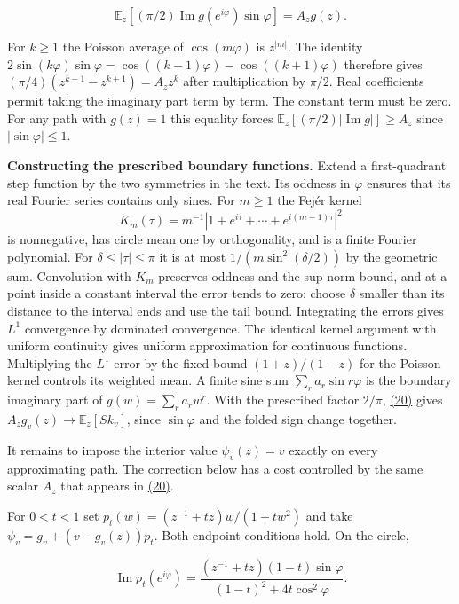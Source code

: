 \documentclass[11pt,a4paper]{article}
\begin{document}
\[
 \mathbb E_z[(\pi/2)\operatorname{Im}g(e^{i\varphi})\sin\varphi]=A_zg(z).
                                                                            \tag{20}\label{eq:20}
\]

For \(k\ge1\) the Poisson average of \(\cos(m\varphi)\) is \(z^{|m|}\). The identity \(2\sin(k\varphi)\sin\varphi=\cos((k-1)\varphi)-\cos((k+1)\varphi)\) therefore gives \((\pi/4)(z^{k-1}-z^{k+1})=A_z z^k\) after multiplication by \(\pi/2\). Real coefficients permit taking the imaginary part term by term. The constant term must be zero. For any path with \(g(z)=1\) this equality forces \(\mathbb E_z[(\pi/2)|\operatorname{Im}g|]\ge A_z\) since \(|\sin\varphi|\le1\).

\textbf{Constructing the prescribed boundary functions.} Extend a first-quadrant step function by the two symmetries in the text. Its oddness in \(\varphi\) ensures that its real Fourier series contains only sines. For \(m\ge1\) the Fejér kernel \[
 K_m(\tau)=m^{-1}|1+e^{i\tau}+\cdots+e^{i(m-1)\tau}|^2
\] is nonnegative, has circle mean one by orthogonality, and is a finite Fourier polynomial. For \(\delta\le|\tau|\le\pi\) it is at most \(1/(m\sin^2(\delta/2))\) by the geometric sum. Convolution with \(K_m\) preserves oddness and the sup norm bound, and at a point inside a constant interval the error tends to zero: choose \(\delta\) smaller than its distance to the interval ends and use the tail bound. Integrating the errors gives \(L^1\) convergence by dominated convergence. The identical kernel argument with uniform continuity gives uniform approximation for continuous functions. Multiplying the \(L^1\) error by the fixed bound \((1+z)/(1-z)\) for the Poisson kernel controls its weighted mean. A finite sine sum \(\sum_r a_r\sin r\varphi\) is the boundary imaginary part of \(g(w)=\sum_r a_rw^r\). With the prescribed factor \(2/\pi\), \hyperref[eq:20]{(20)} gives \(A_z g_v(z)\to\mathbb E_z[Sk_v]\), since \(\sin\varphi\) and the folded sign change together.

It remains to impose the interior value \(\psi_v(z)=v\) exactly on every approximating path. The correction below has a cost controlled by the same scalar \(A_z\) that appears in \hyperref[eq:20]{(20)}.

For \(0<t<1\) set \(p_t(w)=(z^{-1}+tz)w/(1+tw^2)\) and take \(\psi_v=g_v+(v-g_v(z))p_t\). Both endpoint conditions hold. On the circle,

\[
 \operatorname{Im}p_t(e^{i\varphi})
 =\frac{(z^{-1}+tz)(1-t)\sin\varphi}{(1-t)^2+4t\cos^2\varphi}.
\]
\end{document}
